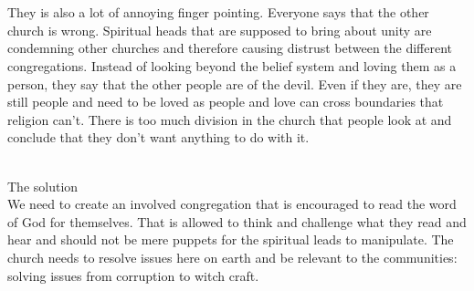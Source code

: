 \documentclass[10pt,a4paper]{report}
\begin{document}
\\
\\They is also a lot of annoying finger pointing. Everyone says that the other church is wrong. Spiritual heads that are supposed to bring about unity are condemning other churches and therefore causing distrust between the different congregations. Instead of looking beyond the belief system and loving them as a person, they say that the other people are of the devil. Even if they are, they are still people and need to be loved as people and love can cross boundaries that religion can't. There is too much division in the church that people look at and conclude that they don't want anything to do with it. 
\\
\\\maketitle The solution
\\ We need to create an involved congregation that is encouraged to read the word of God for themselves. That is allowed to think and challenge what they read and hear and should not be mere puppets for the spiritual leads to manipulate. The church needs to resolve issues here on earth and be relevant to the communities: solving issues from corruption to witch craft.  
\end{document}

